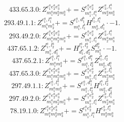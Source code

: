 \documentclass[letterpaper,10pt,fleqn,leqno,onecolumn]{article}
\begin{document}
\begin{equation} \;\;\;\;\;\;  433.65.3.0: Z^{e_{1}^{a}e_{2}^{a}e_{3}^{a}}_{m_{1}^{a}m_{2}^{a}m_{3}^{a}}+=S^{e_{1}^{a}e_{2}^{a}}_{m_{1}^{a},l_{1}^{a}}Z^{e_{3}^{a},l_{1}^{a}}_{m_{2}^{a}m_{3}^{a}} \end{equation}
\begin{equation} \;\;\;\;\;\;  293.49.1.1: Z^{e_{1}^{a},l_{1}^{a}}_{m_{1}^{a}m_{2}^{a}}+=S^{e_{1}^{a},d_{1}^{b}}_{m_{1}^{a},l_{1}^{b}}H^{l_{1}^{b},l_{1}^{a}}_{m_{2}^{a},d_{1}^{b}}\cdot -1. \end{equation}
\begin{equation} \;\;\;\;\;\;  293.49.2.0: Z^{e_{1}^{a}e_{2}^{a}e_{3}^{a}}_{m_{1}^{a}m_{2}^{a}m_{3}^{a}}+=S^{e_{1}^{a}e_{2}^{a}}_{m_{1}^{a},l_{1}^{a}}Z^{e_{3}^{a},l_{1}^{a}}_{m_{2}^{a}m_{3}^{a}} \end{equation}
\begin{equation} \;\;\;\;\;\;  437.65.1.2: Z^{l_{1}^{a},l_{2}^{a}}_{m_{1}^{a},d_{1}^{a}}+=H^{l_{1}^{a},l_{2}^{a}}_{d_{1}^{a},d_{2}^{a}}S^{d_{2}^{a}}_{m_{1}^{a}}\cdot -1. \end{equation}
\begin{equation} \;\;\;\;\;\;  437.65.2.1: Z^{e_{1}^{a},l_{1}^{a}}_{m_{1}^{a}m_{2}^{a}}+=S^{e_{1}^{a},d_{1}^{a}}_{m_{1}^{a},l_{2}^{a}}Z^{l_{1}^{a},l_{2}^{a}}_{m_{2}^{a},d_{1}^{a}} \end{equation}
\begin{equation} \;\;\;\;\;\;  437.65.3.0: Z^{e_{1}^{a}e_{2}^{a}e_{3}^{a}}_{m_{1}^{a}m_{2}^{a}m_{3}^{a}}+=S^{e_{1}^{a}e_{2}^{a}}_{m_{1}^{a},l_{1}^{a}}Z^{e_{3}^{a},l_{1}^{a}}_{m_{2}^{a}m_{3}^{a}} \end{equation}
\begin{equation} \;\;\;\;\;\;  297.49.1.1: Z^{e_{1}^{a},l_{1}^{a}}_{m_{1}^{a}m_{2}^{a}}+=S^{e_{1}^{a},d_{1}^{a}}_{m_{1}^{a},l_{2}^{a}}H^{l_{1}^{a},l_{2}^{a}}_{m_{2}^{a},d_{1}^{a}} \end{equation}
\begin{equation} \;\;\;\;\;\;  297.49.2.0: Z^{e_{1}^{a}e_{2}^{a}e_{3}^{a}}_{m_{1}^{a}m_{2}^{a}m_{3}^{a}}+=S^{e_{1}^{a}e_{2}^{a}}_{m_{1}^{a},l_{1}^{a}}Z^{e_{3}^{a},l_{1}^{a}}_{m_{2}^{a}m_{3}^{a}} \end{equation}
\begin{equation} \;\;\;\;\;\;  78.19.1.0: Z^{e_{1}^{a}e_{2}^{a}e_{3}^{a}}_{m_{1}^{a}m_{2}^{a}m_{3}^{a}}+=S^{e_{1}^{a}e_{2}^{a}}_{m_{1}^{a},l_{1}^{a}}H^{e_{3}^{a},l_{1}^{a}}_{m_{2}^{a}m_{3}^{a}} \end{equation}
\end{document}
